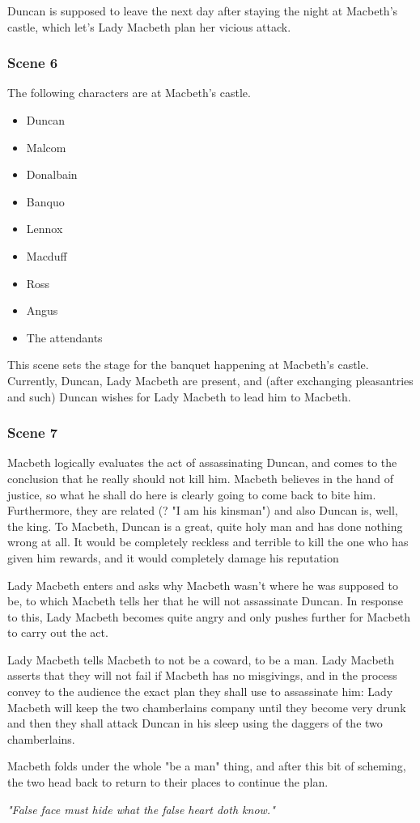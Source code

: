 Duncan is supposed to leave the next day after staying the night at Macbeth's castle, which let's Lady Macbeth plan her vicious attack.

\subsubsection{Scene 6}

The following characters are at Macbeth's castle.
\begin{multicols}{3}
\begin{itemize}
    \item Duncan
    \item Malcom
    \item Donalbain
    \item Banquo
    \item Lennox
    \item Macduff
    \item Ross
    \item Angus
    \item The attendants
\end{itemize}
\end{multicols}
This scene sets the stage for the banquet happening at Macbeth's castle. Currently, Duncan, Lady Macbeth are present, and (after exchanging pleasantries and such) Duncan wishes for Lady Macbeth to lead him to Macbeth.

\subsubsection{Scene 7}

Macbeth logically evaluates the act of assassinating Duncan, and comes to the
conclusion that he really should not kill him. Macbeth believes in the hand of
justice, so what he shall do here is clearly going to come back to bite him.
Furthermore, they are related (? "I am his kinsman") and also Duncan is, well,
the king. To Macbeth, Duncan is a great, quite holy man and has done nothing wrong at all. It would be completely reckless and terrible to kill the one who has given him rewards, and it would completely damage his reputation

Lady Macbeth enters and asks why Macbeth wasn't where he was supposed to be, to
which Macbeth tells her that he will not assassinate Duncan. In response to
this, Lady Macbeth becomes quite angry and only pushes further for Macbeth to
carry out the act.

Lady Macbeth tells Macbeth to not be a coward, to be a man. Lady Macbeth
asserts that they will not fail if Macbeth has no misgivings, and in the
process convey to the audience the exact plan they shall use to assassinate
him: Lady Macbeth will keep the two chamberlains company until they become very
drunk and then they shall attack Duncan in his sleep using the daggers of the two chamberlains.

Macbeth folds under the whole "be a man" thing, and after this bit of scheming, the two head back to return to their places to continue the plan.

\textit{"False face must hide what the false heart doth know."}
